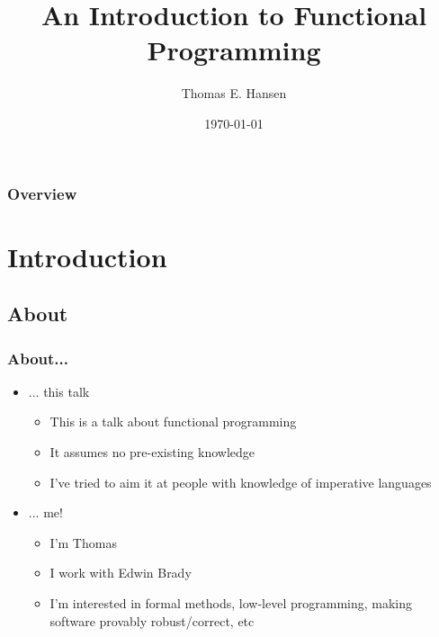 \documentclass{beamer}
\title{An Introduction to Functional Programming}
\author{Thomas E. Hansen}
\institute{University of St Andrews}
\date{\today}
\begin{document}
\begin{frame}[plain]
  \titlepage
\end{frame}

\begin{frame}
  \frametitle{Overview}
  \tableofcontents
\end{frame}

\section{Introduction}
  \subsection{About}
  \begin{frame}
    \frametitle{About...}
    \begin{itemize}
      \item ... this talk
            \begin{itemize}
              \item This is a talk about functional programming
              \item It assumes no pre-existing knowledge
              \item I've tried to aim it at people with knowledge of imperative
                    languages
            \end{itemize}
      \item ... me!
            \begin{itemize}
              \item I'm Thomas
              \item I work with Edwin Brady
              \item I'm interested in formal methods, low-level programming,
                    making software provably robust/correct, etc
            \end{itemize}
    \end{itemize}
  \end{frame}
\end{document}
